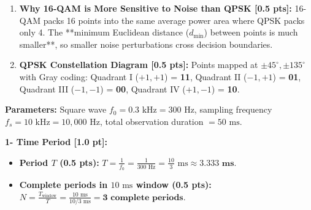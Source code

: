 \documentclass[10pt,a4paper]{article}
\begin{document}
\begin{enumerate}[leftmargin=14pt, itemsep=2.5pt, topsep=1pt]
    \item \textbf{Why 16-QAM is More Sensitive to Noise than QPSK [0.5 pts]:}  
    16-QAM packs 16 points into the same average power area where QPSK packs only 4. The **minimum Euclidean distance ($d_{\min}$) between points is much smaller**, so smaller noise perturbations cross decision boundaries.

    \item \textbf{QPSK Constellation Diagram [0.5 pts]:}  
    Points mapped at $\pm 45^\circ, \pm 135^\circ$ with Gray coding: Quadrant I ($+1,+1$) = \textbf{11}, Quadrant II ($-1,+1$) = \textbf{01}, Quadrant III ($-1,-1$) = \textbf{00}, Quadrant IV ($+1,-1$) = \textbf{10}.
\end{enumerate}

\clearpage

\par\vspace{2pt}

\begin{tcolorbox}[
    colframe=themeblue,
    colback=lightbg,
    arc=1.2mm,
    boxrule=0.5pt,
    left=5pt, right=5pt, top=2.5pt, bottom=2.5pt
]
\footnotesize
\textbf{Parameters:} Square wave $f_0 = 0.3\text{ kHz} = 300\text{ Hz}$, sampling frequency $f_s = 10\text{ kHz} = 10,000\text{ Hz}$, total observation duration $= 50\text{ ms}$.
\end{tcolorbox}

\vspace{1pt}

\noindent\textbf{1- Time Period [1.0 pt]:}
\begin{itemize}[leftmargin=12pt, itemsep=1.5pt]
    \item \textbf{Period $T$ (0.5 pts):} $T = \frac{1}{f_0} = \frac{1}{300\text{ Hz}} = \frac{10}{3}\text{ ms} \approx \mathbf{3.333\text{ ms}}$.
    \item \textbf{Complete periods in $10\text{ ms}$ window (0.5 pts):} $N = \frac{T_{\text{window}}}{T} = \frac{10\text{ ms}}{10/3\text{ ms}} = \mathbf{3\text{ complete periods}}$.
\end{itemize}

\vspace{1pt}
\end{document}
